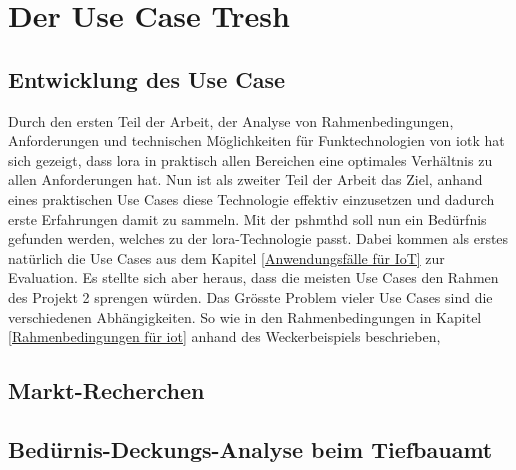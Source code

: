 \chapter{Der Use Case Tresh}
\section{Entwicklung des Use Case}
Durch den ersten Teil der Arbeit, der Analyse von Rahmenbedingungen, Anforderungen und technischen Möglichkeiten für Funktechnologien von \gls{iotk} hat sich gezeigt, dass \gls{lora} in praktisch allen Bereichen eine optimales Verhältnis zu allen Anforderungen hat. Nun ist als zweiter Teil der Arbeit das Ziel, anhand eines praktischen Use Cases diese Technologie effektiv einzusetzen und dadurch erste Erfahrungen damit zu sammeln. Mit der \gls{pshmthd} soll nun ein Bedürfnis gefunden werden, welches zu der \gls{lora}-Technologie passt. Dabei kommen als erstes natürlich die Use Cases aus dem Kapitel \ref{Anwendungsfälle für IoT} zur Evaluation. Es stellte sich aber heraus, dass die meisten Use Cases den Rahmen des Projekt 2 sprengen würden. Das Grösste Problem vieler Use Cases sind die verschiedenen Abhängigkeiten. So wie in den Rahmenbedingungen in Kapitel \ref{Rahmenbedingungen für iot} anhand des Weckerbeispiels beschrieben,   

\section{Markt-Recherchen}

\section{Bedürnis-Deckungs-Analyse beim Tiefbauamt}